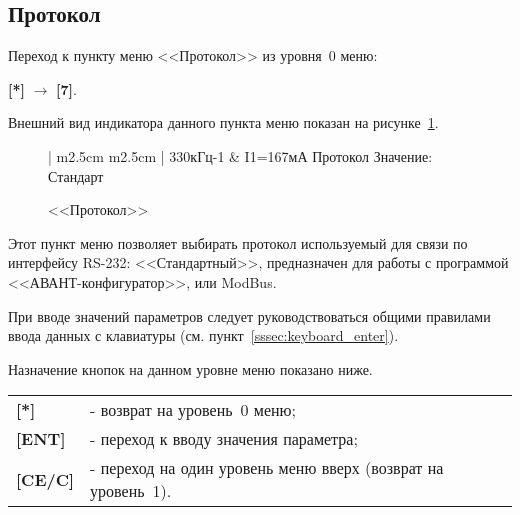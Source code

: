 \subsection{Протокол}	\label{ssec:protocol}

Переход к пункту меню <<Протокол>> из уровня~0 меню: 

\textbf{[*]} $\rightarrow$ \textbf{[7]}.

Внешний вид индикатора данного пункта меню показан на рисунке~\ref{fig:protocol}.
 
 \begin{figure}[H]
 	\centering
 	
	\begin{tabular}{| m{2.5cm}  m{2.5cm} |}
		\firsthline
		330кГц-1	& \raggedleft I1=167мА			\tabularnewline 
		 {Протокол}				\tabularnewline
		 {Значение: Стандарт} 	\tabularnewline 
		 {}						\tabularnewline 
		\lasthline
	\end{tabular} 
	
	\caption{<<Протокол>>}
	\label{fig:protocol}
\end{figure}

Этот пункт меню позволяет выбирать протокол используемый для связи по интерфейсу RS-232: <<Стандартный>>, предназначен для работы с программой <<АВАНТ-конфигуратор>>, или ModBus.

При вводе значений параметров следует руководствоваться общими правилами ввода данных с клавиатуры (см. пункт~\ref{sssec:keyboard_enter}).

Назначение кнопок на данном уровне меню показано ниже.
\begin{center}
	\begin{tabular}{p{2cm} p{15cm}}
		\textbf{[*]} 			& - возврат на уровень~0 меню; \tabularnewline
		\textbf{[ENT]} 			& - переход к вводу значения параметра; \tabularnewline
		\textbf{[CE/C]} 		& - переход на один уровень меню вверх (возврат на уровень~1). \tabularnewline				
	\end{tabular}
\end{center}